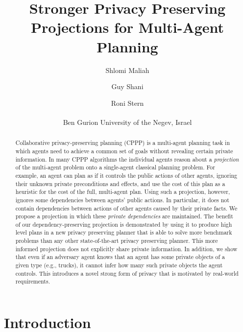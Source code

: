 \documentclass[letterpaper]{article}
\theoremstyle{definition}
\begin{document}
%
\title{Stronger Privacy Preserving Projections for Multi-Agent Planning}
\author{Shlomi Maliah \and Guy Shani \and Roni Stern\\\\
Ben Gurion University of the Negev, Israel\\
}
\maketitle
\begin{abstract}
Collaborative privacy-preserving planning (CPPP) is a multi-agent planning task in which agents need to achieve a common set of goals without revealing certain private information. In many CPPP algorithms the individual agents reason about a {\em projection} of the multi-agent problem onto a single-agent classical planning problem. 
For example, an agent can plan as if it controls the public actions of other agents, ignoring their unknown private preconditions and effects, and use the cost of this plan as a heuristic for the cost of the full, multi-agent plan. Using such a projection, however, ignores some dependencies between agents' public actions. In particular, it does not contain dependencies between actions  of other agents caused by their private facts. We propose a projection in which these {\em private dependencies} are maintained. 
The benefit of our dependency-preserving projection is demonstrated by using it to produce high level plans in a new privacy preserving planner that is able to solve more benchmark problems than any other state-of-the-art privacy preserving planner. 
This more informed projection does not explicitly share private information. In addition, we show that even if an adversary agent knows that an agent has some private objects of a given type (e.g., trucks), it cannot infer how many such private objects the agent controls. This introduces a novel strong form of privacy that is motivated by real-world requirements. 
\end{abstract}
\section{Introduction}


\end{document}
